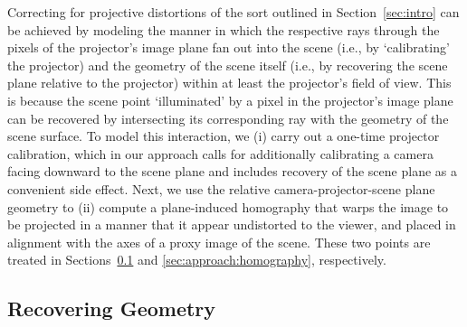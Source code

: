 \documentclass[review]{elsarticle}
\begin{document}
Correcting for projective distortions of the sort outlined in Section~\ref{sec:intro} can be achieved by modeling the manner in which the respective rays through the pixels of the projector's image plane fan out into the scene (i.e., by `calibrating' the projector) and the geometry of the scene itself (i.e., by recovering the scene plane relative to the projector) within at least the projector's field of view. This is because the scene point `illuminated' by a pixel in the projector's image plane can be recovered by intersecting its corresponding ray with the geometry of the scene surface. To model this interaction, we (i) carry out a one-time projector calibration, which in our approach calls for additionally calibrating a camera facing downward to the scene plane and includes recovery of the scene plane as a convenient side effect. Next, we use the relative camera-projector-scene plane geometry to (ii) compute a plane-induced homography that warps the image to be projected in a manner that it appear undistorted to the viewer, and placed in alignment with the axes of a proxy image of the scene. These two points are treated in Sections~\ref{sec:approach:geometry} and \ref{sec:approach:homography}, respectively.

\subsection{Recovering Geometry}\label{sec:approach:geometry}
\end{document}
